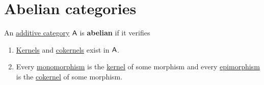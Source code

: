 \documentclass[../../../main]{subfiles}
\begin{document}
\section{Abelian categories}

\begin{definition} \label{def:abelian-category}
  An \hyperref[def:additive-category]{additive category} \(\mathsf{A}\) is \textbf{abelian} if it verifies
  \begin{enumerate}
    \item[A.4)]\label{axiom:abelian-existence} \hyperref[def:categorical-kernel]{Kernels} and \hyperref[def:categorical-cokernel]{cokernels} exist in \(\mathsf{A}\).
    \item[A.5)]\label{axiom:abelian-morphisms} Every \hyperref[def:mono-epi-morphism]{monomorphism} is the \hyperref[def:categorical-kernel]{kernel} of some morphism and every \hyperref[def:mono-epi-morphism]{epimorphism} is the \hyperref[def:categorical-cokernel]{cokernel} of some morphism.
  \end{enumerate}
\end{definition}
\end{document}
